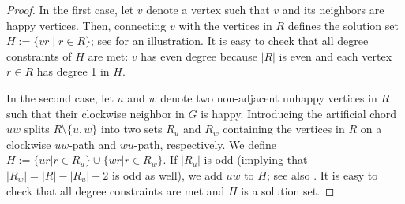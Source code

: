 \documentclass[a4paper,runningheads,cleveref,thm-restate]{lipics-v2021}
\newcommand{\hset}{solution set\xspace}
\begin{document}
\begin{proof}
	In the first case, let $v$ denote a vertex such that $v$ and its neighbors are happy vertices.
	Then, connecting $v$ with the vertices in $R$ defines the \hset  $H:=\{vr \mid r\in R\}$; see   for an illustration. 
	It is easy to check that all degree constraints of $H$ are met: $v$ has even degree because $|R|$ is even and each vertex $r\in R$ has degree 1 in $H$. 
	
	In the second case, let $u$ and $w$ denote two non-adjacent unhappy vertices in $R$ such that their clockwise neighbor in $G$ is happy. 
	Introducing the artificial chord $uw$ splits $R\setminus\{u,w\}$ into two sets $R_u$ and $R_w$ containing the vertices in $R$ on a clockwise $uw$-path and $wu$-path, respectively. 
	We define $H:=\{ur| r\in R_u\}\cup \{wr| r\in R_w\}$. 
	If $|R_u|$ is odd (implying that $|R_w|=|R|-|R_u|-2$ is odd as well), we add $uw$ to $H$; see also . 
	It is easy to check that all degree constraints are met and $H$ is a \hset.
\end{proof}
\end{document}
